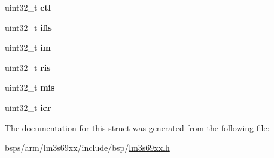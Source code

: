 \begin{DoxyCompactItemize}
\mbox{\label{structlm3s69xx__uart_ab4d694fa4b0359f59ad4e7c05bc9d591}} 
uint32\+\_\+t {\bfseries ctl}
\item 
\mbox{\label{structlm3s69xx__uart_afa4fbec3065e5aca205c89c70ee8b501}} 
uint32\+\_\+t {\bfseries ifls}
\item 
\mbox{\label{structlm3s69xx__uart_a7d9d94fdb91dfced43fb888ac3b03528}} 
uint32\+\_\+t {\bfseries im}
\item 
\mbox{\label{structlm3s69xx__uart_abcae473d711d30d8a41428509f5bb78a}} 
uint32\+\_\+t {\bfseries ris}
\item 
\mbox{\label{structlm3s69xx__uart_aa9b9d8ccf66052fbe2bc33e3d4eabd90}} 
uint32\+\_\+t {\bfseries mis}
\item 
\mbox{\label{structlm3s69xx__uart_a1831f21bc21ec40ee55b16d01dc9dcf4}} 
uint32\+\_\+t {\bfseries icr}
\end{DoxyCompactItemize}


The documentation for this struct was generated from the following file\+:\begin{DoxyCompactItemize}
\item 
bsps/arm/lm3s69xx/include/bsp/\mbox{\hyperlink{lm3s69xx_8h}{lm3s69xx.\+h}}\end{DoxyCompactItemize}
